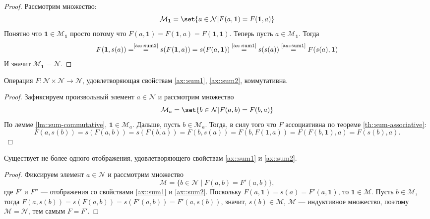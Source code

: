 \documentclass{article}
\begin{document}
\begin{proof}
    Рассмотрим множество:
    \[
        \mathcal{M}_{\mathbf{1}} =  \set{a \in \mathcal{N} | F(a, \mathbf{1}) = F(\mathbf{1}, a)}
    \]
    Понятно что $\mathbf{1} \in \mathcal{M}_{\mathbf{1}}$ просто потому что $F(a, \mathbf{1}) = F(\mathbf{1}, a) = F(\mathbf{1}, \mathbf{1})$. Теперь пусть $a \in \mathcal{M}_{\mathbf{1}}$. Тогда
    \[
        F(\mathbf{1}, s(a)) = \overset{\text{\eqref{ax::sum2}}}{=} s(F(\mathbf{1}, a)) = s(F(a, \mathbf{1}))  \overset{\text{\eqref{ax::sum1}}}{=} s(s(a))  \overset{\text{\eqref{ax::sum1}}}{=} F(s(a), \mathbf{1})
    \]
    И значит $\mathcal{M}_{\mathbf{1}}  = \mathcal{N}$.
\end{proof}
\begin{theorem}
    \label{th::sum-commutative}
    Операция \( F: \mathcal{N} \times \mathcal{N} \rightarrow \mathcal{N} \), удовлетворяющая свойствам \eqref{ax::sum1}, \eqref{ax::sum2}, коммутативна.    
\end{theorem}
\begin{proof}
    Зафиксируем произвольный элемент $a \in \mathcal{N}$ и рассмотрим множество    
    \[
        \mathcal{M}_{a} =  \set{b \in \mathcal{N} | F(a, b) = F(b, a)}
    \] 
    По лемме \ref{lm::sum-commutative}, $\mathbf{1} \in \mathcal{M}_{a}$. Дальше, пусть $b \in \mathcal{M}_{a}$. Тогда, в силу того что $F$ ассоциативна по теореме \ref{th::sum-associative}:
    \[
        F(a, s(b)) = s(F(a, b)) = s(F(b, a)) = F(b, s(a)) = F(b, F(\mathbf{1}, a)) = F(F(b, \mathbf{1}), a) = F(s(b), a).
    \]
\end{proof}


\begin{theorem}
    \label{th::sum-unique}
    Существует не более одного отображения, удовлетворяющего свойствам \eqref{ax::sum1} и \eqref{ax::sum2}.   
\end{theorem}
\begin{proof}
    Фиксируем элемент \( a \in \mathcal{N} \) и рассмотрим множество
    \[
    \mathcal{M} = \{ b \in \mathcal{N} \mid F(a, b) = F'(a, b) \},
    \]
    где \( F' \) и \( F'' \) --- отображения со свойствами \eqref{ax::sum1} и \eqref{ax::sum2}. Поскольку \( F(a, \mathbf{1}) = s(a) = F'(a, \mathbf{1}) \), то \(\mathbf{1} \in \mathcal{M} \). Пусть \( b \in \mathcal{M} \), тогда \( F(a, s(b)) = s(F(a, b)) = s(F'(a, b)) = F'(a, s(b)) \), значит, \( s(b) \in \mathcal{M} \), \ie \( \mathcal{M} \) --- индуктивное множество, поэтому \( \mathcal{M} = \mathcal{N} \), тем самым \( F = F' \).
\end{proof}
\end{document}
